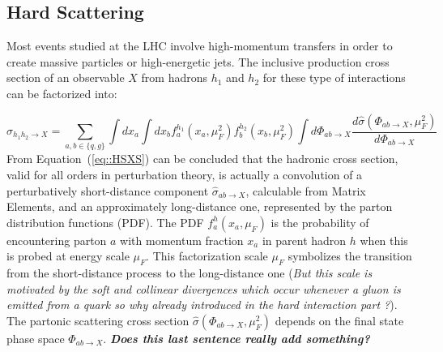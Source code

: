 \subsection{Hard Scattering} \label{sec::HardScattering}
Most events studied at the LHC involve high-momentum transfers in order to create massive particles or high-energetic jets. The inclusive production cross section of an observable $X$ from hadrons $h_1$ and $h_2$ for these type of interactions can be factorized into:

\begin{equation} \label{eq::HSXS}
 \sigma_{h_{1}h_{2} \rightarrow X} =\sum_{a,b \in \{q,g\} } \int dx_{a} \int dx_{b} f_{a}^{h_{1}}(x_{a},\mu^{2}_{F}) f_{b}^{h_{2}}(x_{b},\mu^{2}_{F}) \int d\Phi_{ab \rightarrow X} \dfrac{d\hat{\sigma}(\Phi_{ab \rightarrow X},\mu^{2}_{F})}{d\Phi_{ab \rightarrow X}}
\end{equation}
From Equation~(\ref{eq::HSXS}) can be concluded that the hadronic cross section, valid for all orders in perturbation theory, is actually a convolution of a perturbatively short-distance component $\hat{\sigma}_{ab \rightarrow X}$, calculable from Matrix Elements, and an approximately long-distance one, represented by the parton distribution functions (PDF). The PDF $f_{a}^{h}(x_{a},\mu_{F})$ is the probability of encountering parton $a$ with momentum fraction $x_a$ in parent hadron $h$ when this is probed at energy scale $\mu_{F}$. This factorization scale $\mu_{F}$ symbolizes the transition from the short-distance process to the long-distance one (\textit{But this scale is motivated by the soft and collinear divergences which occur whenever a gluon is emitted from a quark so why already introduced in the hard interaction part ?}). 
The partonic scattering cross section $\hat{\sigma}(\Phi_{ab \rightarrow X},\mu^{2}_{F})$ depends on the final state phase space $\Phi_{ab \rightarrow X}$. 
\textit{\textbf{Does this last sentence really add something?}}\\


